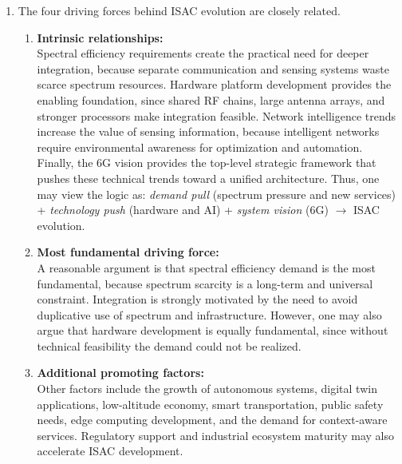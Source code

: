 \begin{enumerate}[label=\textbf{\arabic*.}, leftmargin=*]
    This issue has important implications for ISAC architecture design. It suggests that communication decoding and sensing processing should not always be completely separated. Instead, information sharing between communication and sensing modules may be necessary. It also motivates architectures with shared baseband access, joint receiver design, or dedicated signaling structures that preserve sensing capability.

    \item 
    The four driving forces behind ISAC evolution are closely related.

    \begin{enumerate}[label=(\alph*)]
        \item \textbf{Intrinsic relationships:} \\
        Spectral efficiency requirements create the practical need for deeper integration, because separate communication and sensing systems waste scarce spectrum resources. Hardware platform development provides the enabling foundation, since shared RF chains, large antenna arrays, and stronger processors make integration feasible. Network intelligence trends increase the value of sensing information, because intelligent networks require environmental awareness for optimization and automation. Finally, the 6G vision provides the top-level strategic framework that pushes these technical trends toward a unified architecture. Thus, one may view the logic as: \emph{demand pull} (spectrum pressure and new services) + \emph{technology push} (hardware and AI) + \emph{system vision} (6G) $\rightarrow$ ISAC evolution.

        \item \textbf{Most fundamental driving force:} \\
        A reasonable argument is that spectral efficiency demand is the most fundamental, because spectrum scarcity is a long-term and universal constraint. Integration is strongly motivated by the need to avoid duplicative use of spectrum and infrastructure. However, one may also argue that hardware development is equally fundamental, since without technical feasibility the demand could not be realized.

        \item \textbf{Additional promoting factors:} \\
        Other factors include the growth of autonomous systems, digital twin applications, low-altitude economy, smart transportation, public safety needs, edge computing development, and the demand for context-aware services. Regulatory support and industrial ecosystem maturity may also accelerate ISAC development.
    \end{enumerate}


\end{enumerate}
